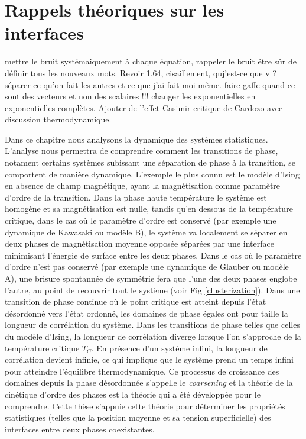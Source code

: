 \chapter{Rappels théoriques sur les interfaces}
{\color{red} mettre le bruit systémaiquement à chaque équation, rappeler le bruit}
{\color{red} être sûr de définir tous les nouveaux mots. Revoir 1.64, cisaillement, quj'est-ce que v ?}
{\color{red} séparer ce qu'on fait les autres et ce que j'ai fait moi-même.}
{\color{red} faire gaffe quand ce sont des vecteurs et non des scalaires !!!}
 {\color{red} changer les exponentielles en exponentielles complètes. Ajouter de l'effet Casimir critique de Cardozo avec discussion thermodynamique.}
  
Dans ce chapitre nous analysons la dynamique des systèmes statistiques. L'analyse nous permettra de comprendre comment les transitions de phase, notament certains systèmes subissant une séparation de phase à la transition, se comportent de manière dynamique. L'exemple le plus connu est le modèle d'Ising en absence de champ magnétique, ayant la magnétisation comme paramètre d'ordre de la transition. Dans la phase haute température le système est homogène et sa magnétisation est nulle, tandis qu'en dessous de la température critique, dans le cas où le paramètre d'ordre est conservé (par exemple une dynamique de Kawasaki ou modèle B), le système va localement se séparer en deux phases de magnétisation moyenne opposée séparées par une interface minimisant l'énergie de surface entre les deux phases. 
Dans le cas où le paramètre d'ordre n'est pas conservé (par exemple une dynamique de Glauber ou modèle A), une brisure spontannée de symmétrie fera que l'une des deux phases englobe l'autre, au point de recouvrir tout le système (voir Fig \ref{clusterization}). Dans une transition de phase continue où le point critique est atteint depuis l'état désordonné vers l'état ordonné, les domaines de phase égales ont pour taille la longueur de corrélation du système. Dans les transitions de phase telles que celles du modèle d'Ising, la longueur de corrélation diverge lorsque l'on s'approche de la température critique $T_C$. En présence d'un système infini, la longueur de corrélation devient infinie, ce qui implique que le système prend un temps infini pour atteindre l'équilibre thermodynamique. Ce processus de croissance des domaines depuis la phase désordonnée s'appelle le \textit{coarsening} et la théorie de la cinétique d'ordre des phases est la théorie qui a été développée pour le comprendre.
Cette thèse s'appuie cette théorie pour déterminer les propriétés statistiques (telles que la position moyenne et sa tension superficielle) des interfaces entre deux phases coexistantes.

